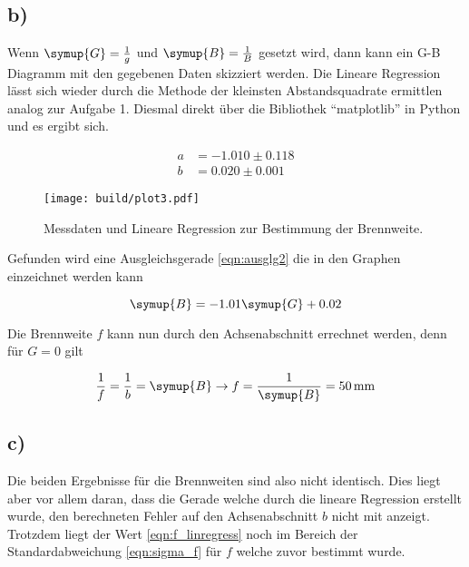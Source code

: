 \subsection{b)}
Wenn $\symup{G} = \frac{1}{g}$ und $\symup{B} = \frac{1}{B}$ gesetzt wird, dann kann ein G-B Diagramm mit den gegebenen
Daten skizziert werden. Die Lineare Regression lässt sich wieder durch die Methode der kleinsten Abstandsquadrate ermittlen analog zur Aufgabe 1. Diesmal direkt
über die Bibliothek \enquote{matplotlib} in Python und es ergibt sich.

\begin{align}
a &= -1.010 \pm 0.118 \\
b &= 0.020 \pm 0.001
\end{align}
\newpage
\begin{figure}[t]
  \centering
  \texttt{[image: build/plot3.pdf]}
  \caption{Messdaten und Lineare Regression zur Bestimmung der Brennweite.}
  \label{fig:plot3}
\end{figure}
\begin{flushleft}
Gefunden wird eine Ausgleichsgerade \eqref{eqn:ausglg2} die in den Graphen einzeichnet werden kann
\end{flushleft}
\begin{equation}
\symup{B} = -1.01 \symup{G} + 0.02
\label{eqn:ausglg2}
\end{equation}
\begin{flushleft}
Die Brennweite $f$ kann nun durch den Achsenabschnitt errechnet werden, denn für $G=0$ gilt
\end{flushleft}
\begin{equation}
\frac{1}{f} = \frac{1}{b} = \symup{B} \to f = \frac{1}{\symup{B}} = \SI{50}{\milli\meter}
\label{eqn:f_linregress}
\end{equation}
\subsection{c)}
Die beiden Ergebnisse für die Brennweiten sind also nicht identisch.
Dies liegt aber vor allem daran, dass die Gerade welche durch die lineare Regression erstellt wurde, den berechneten Fehler auf den Achsenabschnitt $b$ nicht mit anzeigt.
Trotzdem liegt der Wert \eqref{eqn:f_linregress} noch im Bereich der Standardabweichung \eqref{eqn:sigma_f} für $f$ welche zuvor bestimmt wurde.
